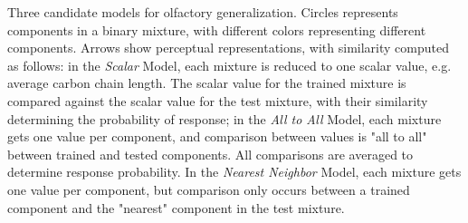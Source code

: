 \label{fig:cartoon}
Three candidate models for olfactory generalization.  Circles represents components in a binary mixture, with different colors representing different components.  Arrows show perceptual representations, with similarity computed as follows: in the \textit{Scalar} Model, each mixture is reduced to one scalar value, e.g. average carbon chain length.  The scalar value for the trained mixture is compared against the scalar value for the test mixture, with their similarity determining the probability of response; in the \textit{All to All} Model, each mixture gets one value per component, and comparison between values is "all to all" between trained and tested components.  All comparisons are averaged to determine response probability.  In the \textit{Nearest Neighbor} Model, each mixture gets one value per component, but comparison only occurs between a trained component and the "nearest" component in the test mixture.  